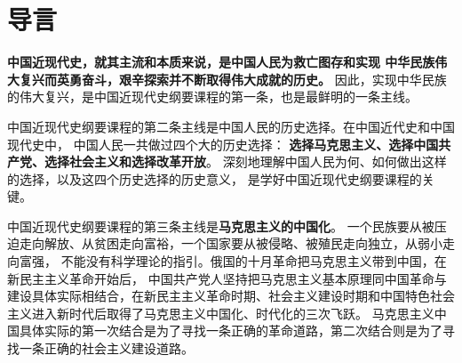 \documentclass[10pt, UTF8]{ctexbook} %
\begin{document}










\pagestyle{plain}
\tableofcontents
\newpage
\thispagestyle{empty}
\cleardoublepage %

\chapter*{导言}
\thispagestyle{empty}

\quad\quad\textbf{中国近现代史，就其主流和本质来说，是中国人民为救亡图存和实现
中华民族伟大复兴而英勇奋斗，艰辛探索并不断取得伟大成就的历史。}
因此，实现中华民族的伟大复兴，是中国近现代史纲要课程的第一条，也是最鲜明的一条主线。

中国近现代史纲要课程的第二条主线是中国人民的历史选择。在中国近代史和中国现代史中，
中国人民一共做过四个大的历史选择：
\textbf{选择马克思主义、选择中国共产党、选择社会主义和选择改革开放}。
深刻地理解中国人民为何、如何做出这样的选择，以及这四个历史选择的历史意义，
是学好中国近现代史纲要课程的关键。

中国近现代史纲要课程的第三条主线是\textbf{马克思主义的中国化}。
一个民族要从被压迫走向解放、从贫困走向富裕，一个国家要从被侵略、被殖民走向独立，从弱小走向富强，
不能没有科学理论的指引。俄国的十月革命把马克思主义带到中国，在新民主主义革命开始后，
中国共产党人坚持把马克思主义基本原理同中国革命与建设具体实际相结合，在新民主主义革命时期、社会主义建设时期和中国特色社会主义进入新时代后取得了马克思主义中国化、时代化的三次飞跃。
马克思主义中国具体实际的第一次结合是为了寻找一条正确的革命道路，第二次结合则是为了寻找一条正确的社会主义建设道路。
\end{document}

